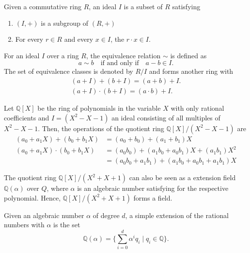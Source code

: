 \documentclass[english,version-2020-11]{uzl-thesis}
\newcommand\Q{{\mathbb Q}}
\begin{document}
\begin{definition}[Ideal]
  Given a commutative ring $R$, an ideal $I$ is a subset of $R$ satisfying
  \begin{enumerate}
    \item $(I, +)$ is a subgroup of $(R, +)$
    \item For every $r \in R$ and every $x \in I$, the $r \cdot x \in I$.
  \end{enumerate}
\end{definition}

\begin{definition}
  For an ideal $I$ over a ring $R$, the equivalence relation $\sim$ is defined as
  \[
    a \sim b \quad \text{if and only if} \quad a - b \in I.
  \]
  The set of equivalence classes is denoted by $R/I$ and forms another ring with
  \begin{align*}
    (a + I) + (b + I) = (a + b) + I. \\
    (a + I) \cdot (b + I) = (a \cdot b) + I.
  \end{align*}
\end{definition}

\begin{example}
  Let $\Q[X]$ be the ring of polynomials in the variable $X$ with only rational
  coefficients and $I = (X^2 - X - 1)$ an ideal consisting of all multiples of $X^2 - X - 1$.
  Then, the operations of the quotient ring $\Q[X]/(X^2 - X - 1)$ are
  \begin{align*}
    (a_0 + a_1 X) + (b_0 + b_1 X)
    & = (a_0 + b_0) + (a_1 + b_1) X \\
    (a_0 + a_1 X) \cdot (b_0 + b_1 X)
    & = (a_0 b_0) + (a_1 b_0 + a_0 b_1) X + (a_1 b_1) X^2 \\
    & = (a_0 b_0 + a_1 b_1) + (a_1 b_0 + a_0 b_1 + a_1 b_1) X
  \end{align*}
\end{example}

The quotient ring $\Q[X]/(X^2 + X + 1)$ can also be seen as a extension field $\Q(\alpha)$ over $Q$,
where $\alpha$ is an algebraic number satisfying for the respective polynomial.
Hence, $\Q[X]/(X^2 + X + 1)$ forms a field.

\begin{definition}
  Given an algebraic number $\alpha$ of degree $d$,
  a simple extension of the rational numbers with $\alpha$ is the set
  \[
    \Q(\alpha) = \{\sum_{i=0}^d \alpha^i q_i \mid q_i \in \Q\}.
  \]
\end{definition}
\end{document}
